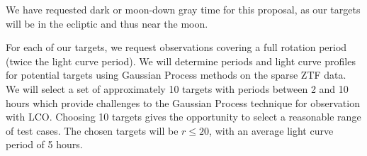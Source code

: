 \documentclass[11pt]{article}
\begin{document}
%

\thepast


%



%

\technicaldescription
We have requested dark or moon-down gray time for this proposal, as our
targets will be in the ecliptic and thus near the moon.

For each of our targets, we request observations covering a
full rotation period (twice the light curve period). We will determine
periods and light curve profiles for potential targets using Gaussian
Process methods on the sparse ZTF data. We will select a set of
approximately 10 targets with periods between 2 and 10 hours which
provide challenges to the Gaussian Process technique for observation
with LCO. Choosing 10 targets gives the opportunity to select a reasonable range
of test cases. The chosen targets will be $r\le20$, with an average 
light curve period of 5 hours.
\end{document}
